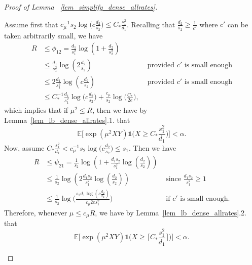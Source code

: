 \documentclass{article}
\newcommand{\EE}{\mathbb{E}}
\newcommand{\one}{\mathds{1}}
\newcommand{\Ct}{C_{*}}
\theoremstyle{remark}
\begin{document}
\begin{proof}[Proof of Lemma ~\ref{lem_simplify_dense_allrates}]
\begin{enumerate}
    Assume first that $c_\mu^{-1}s_2\log\big(c\frac{d_2}{s_2}\big) \leq \Ct \frac{s_1^2}{d_1}$. 
    Recalling that $\frac{d_2}{s_2}\geq \frac{1}{c'}$ where $c'$ can be taken arbitrarily small, we have
    \begin{align*}
        R &\leq \phi_{12} = \frac{d_1}{s_1^2} \log\left(1+\frac{d_2}{s_2^2}\right) &\\
        & \leq \frac{d_1}{s_1^2} \log\left(2\frac{d_2}{s_2}\right) & \text{ provided $c'$ is small enough}\\
        & \leq 2\frac{d_1}{s_1^2} \log\left(c\frac{d_2}{s_2}\right) &\text{ provided $c'$ is small enough}\\
        &\leq \Ct^{-1}\frac{d_1}{s_1^2}\log\Big(c \frac{d_2}{s_2}\Big) + \frac{c_\mu}{s_2}\log\Big(\frac{\Ct}{2e}\Big),&
    \end{align*}
    which implies that if $\mu^2 \leq R$, then we have by Lemma~\ref{lem_lb_dense_allrates}.1. that 
    \[\EE\Big[\exp(\mu^2XY)\one\big(X \geq  \Ct \frac{s_1^2}{d_1} \big)\Big] < \alpha.\]
    Now, assume $\Ct \frac{s_1^2}{d_1} < c_\mu^{-1}s_2\log\big(c\frac{d_2}{s_2}\big) \leq s_1$. 
    Then we have 
    \begin{align*}
        R &\leq \psi_{21} = \frac{1}{s_2} \log\left( 1+ \frac{d_1s_2}{s_1^2} \log\left(\frac{d_2}{s_2}\right)\right)&\\
        & \leq \frac{1}{s_2} \log\left( 2\frac{d_1s_2}{s_1^2} \log\left(\frac{d_2}{s_2}\right)\right) & \text{ since } \frac{d_1s_2}{s_1^2} \geq 1\\
        &\leq \frac{1}{s_2}\log\Big(\frac{s_2d_1\log(c \frac{d_2}{s_2})}{c_\mu 2e s_1^2}\Big) &\text{ if $c'$ is small enough.}
    \end{align*}
    Therefore, whenever $\mu \leq c_\mu R$, we have by Lemma~\ref{lem_lb_dense_allrates}.2. that
    \[\EE\Big[\exp(\mu^2XY)\one\big(X \geq \lceil  \Ct \frac{s_1^2}{d_1}\rceil\big)\Big] < \alpha.\]


\end{enumerate}
\end{proof}
\end{document}
